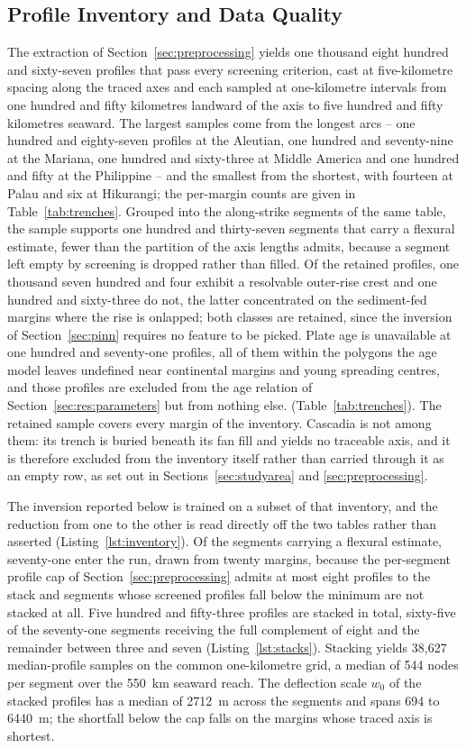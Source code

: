 \documentclass[final]{agujournal2019}
\begin{document}
\subsection{Profile Inventory and Data Quality}\label{sec:res:quality}
The extraction of Section~\ref{sec:preprocessing} yields one thousand eight
hundred and sixty-seven profiles that pass every screening criterion, cast at
five-kilometre spacing along the traced axes and each sampled at one-kilometre
intervals from one hundred and fifty kilometres landward of the axis to five
hundred and fifty kilometres seaward. The largest samples come from the longest
arcs -- one hundred and eighty-seven profiles at the Aleutian, one hundred and
seventy-nine at the Mariana, one hundred and sixty-three at Middle America and
one hundred and fifty at the Philippine -- and the smallest from the shortest,
with fourteen at Palau and six at Hikurangi; the per-margin counts are given in
Table~\ref{tab:trenches}. Grouped into the along-strike segments of the same
table, the sample supports one hundred and thirty-seven segments that carry a
flexural estimate, fewer than the partition of the axis lengths admits, because
a segment left empty by screening is dropped rather than filled. Of the retained
profiles, one thousand seven hundred and four exhibit a resolvable outer-rise
crest and one hundred and sixty-three do not, the latter concentrated on the
sediment-fed margins where the rise is onlapped; both classes are retained,
since the inversion of Section~\ref{sec:pinn} requires no feature to be picked.
Plate age is unavailable at one hundred and seventy-one profiles, all of them
within the polygons the age model leaves undefined near continental margins and
young spreading centres, and those profiles are excluded from the age
relation of Section~\ref{sec:res:parameters} but from nothing else.
(Table~\ref{tab:trenches}). The retained sample covers every margin of the
inventory. Cascadia is not among them: its trench is buried beneath its fan
fill and yields no traceable axis, and it is therefore excluded from the
inventory itself rather than carried through it as an empty row, as set out in
Sections~\ref{sec:studyarea} and \ref{sec:preprocessing}.

The inversion reported below is trained on a subset of that inventory, and the
reduction from one to the other is read directly off the two tables rather than
asserted (Listing~\ref{lst:inventory}). Of the
segments carrying a flexural estimate, seventy-one enter the run, drawn from
twenty margins, because the per-segment profile cap of
Section~\ref{sec:preprocessing} admits at most eight profiles to the stack and
segments whose screened profiles fall below the minimum are not stacked at all.
Five hundred and fifty-three profiles are stacked in total, sixty-five of the
seventy-one segments receiving the full complement of eight and the remainder
between three and seven (Listing~\ref{lst:stacks}). Stacking yields 38{,}627 median-profile samples on the
common one-kilometre grid, a median of 544 nodes per segment over the
550~km seaward reach. The deflection scale $w_{0}$ of the stacked profiles has
a median of 2712~m across the segments and spans 694 to 6440~m; the shortfall
below the cap falls on the margins whose traced axis is shortest.
\end{document}
